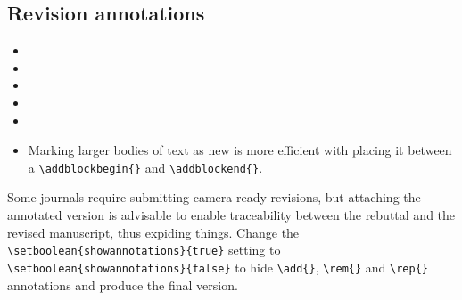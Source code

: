 \documentclass{article}
\begin{document}
\subsection{Revision annotations}

\begin{itemize}
    \item {}
    \item {}
    \item {}
    \item {}
    \item {}
    \item \addblockbegin{} Marking larger bodies of text as new is more efficient with placing it between a \texttt{\textbackslash addblockbegin\{\}} and \texttt{\textbackslash addblockend\{\}}. \addblockend{}
    
\end{itemize}

Some journals require submitting camera-ready revisions, but attaching the annotated version is advisable to enable traceability between the rebuttal and the revised manuscript, thus expiding things. Change the \verb|\setboolean{showannotations}{true}| setting to \verb|\setboolean{showannotations}{false}| to hide \verb|\add{}|, \verb|\rem{}| and \verb|\rep{}| annotations and produce the final version.



\end{document}
